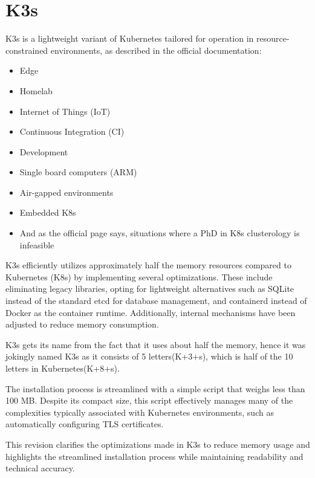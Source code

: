 \section{K3s}
K3s is a lightweight variant of Kubernetes tailored for operation in resource-constrained environments,  as described in the official documentation\cite{k2-1}:
\begin{itemize}
\item Edge
\item Homelab
\item Internet of Things (IoT)
\item Continuous Integration (CI)
\item Development
\item Single board computers (ARM)
\item Air-gapped environments
\item Embedded K8s
\item And as the official page says, situations where a PhD in K8s clusterology is infeasible
\end{itemize}
K3s efficiently utilizes approximately half the memory resources compared to Kubernetes (K8s) by implementing several optimizations. These include eliminating legacy libraries, opting for lightweight alternatives such as SQLite instead of the standard etcd for database management, and containerd instead of Docker as the container runtime. Additionally, internal mechanisms have been adjusted to reduce memory consumption.

K3s gets its name from the fact that it uses about half the memory, hence it was jokingly named K3s as it consists of 5 letters(K+3+s), which is half of the 10 letters in Kubernetes(K+8+s).

The installation process is streamlined with a simple script that weighs less than 100 MB. Despite its compact size, this script effectively manages many of the complexities typically associated with Kubernetes environments, such as automatically configuring TLS certificates.

This revision clarifies the optimizations made in K3s to reduce memory usage and highlights the streamlined installation process while maintaining readability and technical accuracy.


